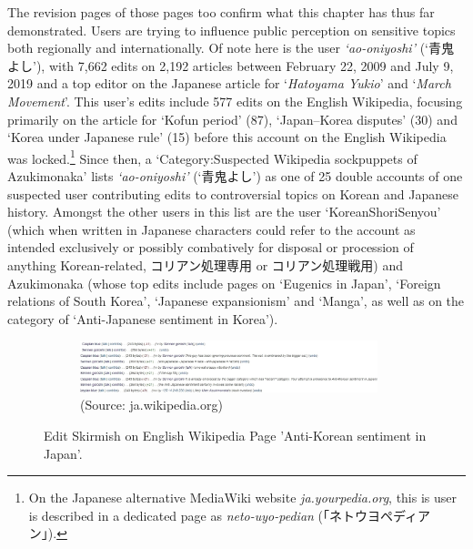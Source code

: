 \documentclass[10pt,british,A4paper,twoside]{memoir}
\begin{document}
The revision pages of those pages too confirm what this chapter has thus
far demonstrated. Users are trying to influence public perception on
sensitive topics both regionally and internationally. Of note here is
the user \emph{`ao-oniyoshi'} (`青鬼よし'), with 7,662 edits on 2,192
articles between February 22, 2009 and July 9, 2019 and a top editor on
the Japanese article for `\emph{Hatoyama Yukio}' and `\emph{March
 Movement}'. This user's edits include 577 edits on the English
Wikipedia, focusing primarily on the article for `Kofun period' (87),
`Japan--Korea disputes' (30) and `Korea under Japanese rule' (15) before
this account on the English Wikipedia was locked.\footnote{On the
  Japanese alternative MediaWiki website \emph{ja.yourpedia.org}, this
  is user is described in a dedicated page as \emph{neto-uyo-pedian}
  (「ネトウヨペディアン」).} Since then, a `Category:Suspected Wikipedia
sockpuppets of Azukimonaka' lists \emph{`ao-oniyoshi'} (`青鬼よし') as
one of 25 double accounts of one suspected user contributing edits to
controversial topics on Korean and Japanese history. Amongst the other
users in this list are the user `KoreanShoriSenyou' (which when written
in Japanese characters could refer to the account as intended
exclusively or possibly combatively for disposal or procession of
anything Korean-related, コリアン処理専用 or コリアン処理戦用) and
Azukimonaka (whose top edits include pages on `Eugenics in Japan',
`Foreign relations of South Korea', `Japanese expansionism' and `Manga',
as well as on the category of `Anti-Japanese sentiment in Korea').

\begin{figure}[!htb]
 \centering
 \begin{subfigure}[b]{1\textwidth}
 \includegraphics[width=0.95\textwidth,trim=4 4 4 4,clip]{images/wiki/sennen-caspian2.jpg}
 \caption*{(Source: ja.wikipedia.org)}
 \end{subfigure}
 \caption{\label{fig:caspian} Edit Skirmish on English Wikipedia Page 'Anti-Korean sentiment in Japan'.}
\end{figure}
\end{document}
